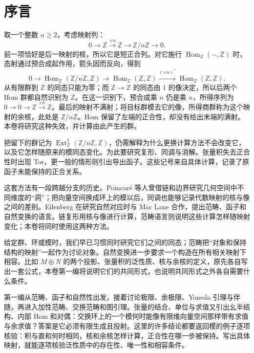 \chapter*{序言}

取一个整数 \(n\ge2\)，考虑映射列：
\[
	0\longrightarrow\mathbb Z\xrightarrow{\times n}\mathbb Z \longrightarrow\mathbb Z/n\mathbb Z\longrightarrow0.
\]
前一项恰好是后一映射的核，所以它是短正合列。对它施行 \(\operatorname{Hom}_{\mathbb Z}(-,\mathbb Z)\) 时，态射通过预合成起作用，箭头因而反向，得到
\[
	0\longrightarrow\operatorname{Hom}_{\mathbb Z}(\mathbb Z/n\mathbb Z,\mathbb Z) \longrightarrow\operatorname{Hom}_{\mathbb Z}(\mathbb Z,\mathbb Z) \xrightarrow{(\times n)^*}\operatorname{Hom}_{\mathbb Z}(\mathbb Z,\mathbb Z).
\]
从有限群到 \(\mathbb Z\) 的同态只能为零；而 \(\mathbb Z\to\mathbb Z\) 的同态由 \(1\) 的像决定，所以后两个 Hom 群都自然识别为 \(\mathbb Z\)。在这一识别下，预合成乘 \(n\) 仍是乘 \(n\)，所得序列为 \(0\to0\to\mathbb Z\xrightarrow{\times n}\mathbb Z\)。最后的映射不满射；将目标群模去它的像，所得商群称为这个映射的余核，此处是 \(\mathbb Z/n\mathbb Z\)。Hom 保留了左端的正合性，却没有给出末端的满射。本卷将研究这种失效，并计算由此产生的群。

\ProseParagraphBreak
把留下的群记为 \(\operatorname{Ext}^{1}_{\mathbb Z}(\mathbb Z/n\mathbb Z,\mathbb Z)\)，仍需解释为什么更换计算方法不会改变它，以及它怎样随原来的模同态变化。为此要研究复形、同调与消解。张量积失去正合性时出现 Tor，更一般的情形则引出导出函子。这些记号来自具体计算，记录了原函子未能保持的正合关系。

\ProseParagraphBreak
这套方法有一段跨越分支的历史。Poincaré 等人曾借链和边界研究几何空间中不同维度的“洞”；把向量空间换成环上的模以后，同调也能够记录代数映射的核与像之间的差别\cite[Section 1.1]{Weibel1994HomologicalAlgebra}。Eilenberg 在研究自然对应时与 Mac Lane 合作，提出范畴、函子和自然变换的语言。链复形用核与像进行计算，范畴语言则说明这些计算怎样随映射变化；本卷将同时使用这两种方法。

\ProseParagraphBreak
给定群、环或模时，我们早已习惯同时研究它们之间的同态；范畴把“对象和保持结构的映射”一起作为讨论对象。自然变换进一步要求一个构造在所有相关映射下相容。比如 \(M\oplus N\) 的两个投影、张量积的泛性质、核与余核的定义，原先各自写出一套公式，本卷第一编将说明它们的共同形式，也说明共同形式之外各自需要什么条件。

\ProseParagraphBreak
第一编从范畴、函子和自然性出发，接着讨论极限、余极限、Yoneda 引理与伴随，再进入加性范畴、交换范畴和图引理。张量的结合、单位与求值又引出幺半结构、内部 Hom 和对偶：交换环上的一个模何时能像有限维向量空间那样带有求值与余求值？答案是它必须有限生成且投射。这里的许多结论都要返回模的例子逐项核验：积与直和何时相同，核和余核怎样计算，正合性在哪一步被保持。写出具体映射，就能逐项核验泛性质中的存在性、唯一性和相容条件。

